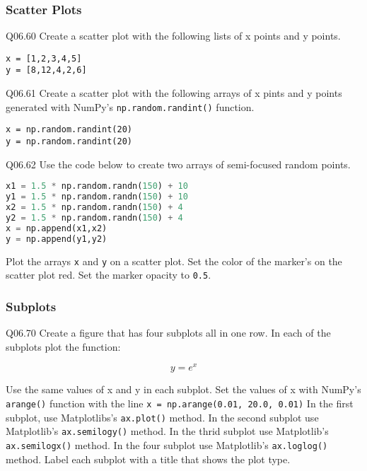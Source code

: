 \documentclass{book}
\newcommand{\passthrough}[1]{#1}
\begin{document}
    
        \hypertarget{scatter-plots}{%
\subsubsection{Scatter Plots}\label{scatter-plots}}

Q06.60 Create a scatter plot with the following lists of x points and y
points.

\begin{lstlisting}
x = [1,2,3,4,5]
y = [8,12,4,2,6]
\end{lstlisting}

Q06.61 Create a scatter plot with the following arrays of x pints and y
points generated with NumPy's
\passthrough{\lstinline!np.random.randint()!} function.

\begin{lstlisting}
x = np.random.randint(20)
y = np.random.randint(20)
\end{lstlisting}

Q06.62 Use the code below to create two arrays of semi-focused random
points.

\begin{lstlisting}[language=Python]
x1 = 1.5 * np.random.randn(150) + 10
y1 = 1.5 * np.random.randn(150) + 10
x2 = 1.5 * np.random.randn(150) + 4
y2 = 1.5 * np.random.randn(150) + 4
x = np.append(x1,x2)
y = np.append(y1,y2)
\end{lstlisting}

Plot the arrays \passthrough{\lstinline!x!} and
\passthrough{\lstinline!y!} on a scatter plot. Set the color of the
marker's on the scatter plot red. Set the marker opacity to
\passthrough{\lstinline!0.5!}.
    




    
        \hypertarget{subplots}{%
\subsubsection{Subplots}\label{subplots}}

Q06.70 Create a figure that has four subplots all in one row. In each of
the subplots plot the function:

\[ y = e^x \]

Use the same values of x and y in each subplot. Set the values of x with
NumPy's \passthrough{\lstinline!arange()!} function with the line
\passthrough{\lstinline!x = np.arange(0.01, 20.0, 0.01)!} In the first
subplot, use Matplotlibs's \passthrough{\lstinline!ax.plot()!} method.
In the second subplot use Matplotlib's
\passthrough{\lstinline!ax.semilogy()!} method. In the thrid subplot use
Matplotlib's \passthrough{\lstinline!ax.semilogx()!} method. In the four
subplot use Matplotlib's \passthrough{\lstinline!ax.loglog()!} method.
Label each subplot with a title that shows the plot type.
\end{document}
